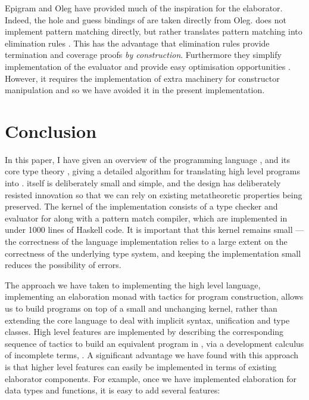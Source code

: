 Epigram \cite{McBride2004a} and Oleg \cite{McBride1999} 
have provided much of the inspiration for the \Idris{} elaborator. Indeed,
the hole and guess bindings of \TTdev{} are taken directly from Oleg.
\Epigram{} does not implement pattern matching directly, but rather translates
pattern matching into elimination rules \cite{McBride2002}. This has the
advantage that
elimination rules provide termination and coverage proofs \emph{by construction}.
Furthermore they simplify implementation of the evaluator and provide easy
optimisation opportunities \cite{Brady2003}. However, it requires the
implementation of extra machinery for constructor manipulation
\cite{McBride2006} and so we have avoided it in the present implementation.



\section{Conclusion}

\label{sect:conclusion}

In this paper, I have given an overview of the programming language \Idris{},
and its core type theory \TT{}, giving a detailed algorithm for translating
high level programs into \TT{}.
\TT{} itself is deliberately small and simple, and the design has deliberately
resisted innovation so that we can rely on existing metatheoretic properties
being preserved. The kernel of the \Idris{} implementation consists of a type checker
and evaluator for \TT{} along with a pattern match compiler, which are implemented
in under 1000 lines of Haskell code. It is important that this kernel remains small
--- the correctness of the language implementation relies to a large extent on
the correctness of the underlying type system, and keeping the implementation small
reduces the possibility of errors.

The approach we have taken to implementing the high level language,
implementing an elaboration monad with tactics for program construction, allows
us to build programs on top of a small and unchanging kernel, rather than
extending the core language to deal with implicit syntax, unification and type
classes.  High level \Idris{} features are implemented by describing the
corresponding sequence of tactics to build an equivalent program in \TT{}, via
a development calculus of incomplete terms, \TTdev{}. A significant advantage
we have found with this approach is that higher level features can easily be
implemented in terms of existing elaborator components. For example, once we
have implemented elaboration for data types and functions, it is easy to add
several features:

